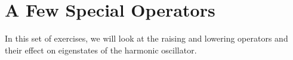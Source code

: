 %
%
%
%

\section*{A Few Special Operators}

	In this set of exercises, we will look at the raising and lowering operators and their effect on eigenstates of the harmonic oscillator.

